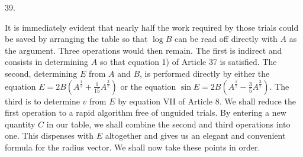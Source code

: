 \par{}
\begin{center}
\hypertarget{native-057-article039}{}39.
\end{center}
It is immediately evident that nearly half the work required by those trials could be saved by arranging the table so that $\log B$ can be read off directly with $A$ as the argument. Three operations would then remain. The first is indirect and consists in determining $A$ so that equation 1) of Article 37 is satisfied. The second, determining $E$ from $A$ and $B$, is performed directly by either the equation $E=2B(A^{\frac{1}{2}}+\tfrac{1}{15}A^{\frac{3}{2}})$ or the equation $\sin E=2B(A^{\frac{1}{2}}-\tfrac{3}{5}A^{\frac{3}{2}})$. The third is to determine $v$ from $E$ by equation VII of Article 8. We shall reduce the first operation to a rapid algorithm free of unguided trials. By entering a new quantity $C$ in our table, we shall combine the second and third operations into one. This dispenses with $E$ altogether and gives us an elegant and convenient formula for the radius vector. We shall now take these points in order.

